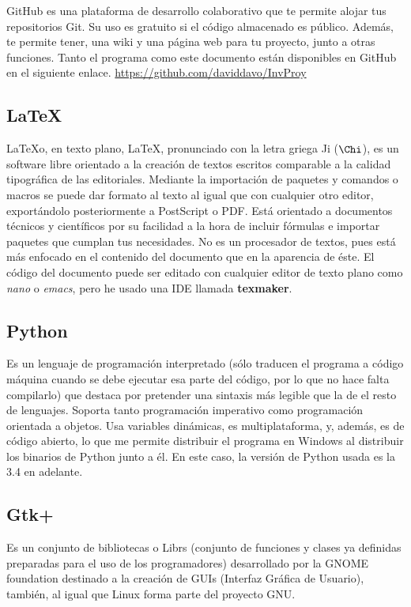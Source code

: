 \documentclass[a4paper, 11pt]{report} %
\begin{document}
GitHub es una plataforma de desarrollo colaborativo que te permite alojar tus repositorios Git. Su uso es gratuito si el código almacenado es público. Además, te permite tener, una wiki y una página web para tu proyecto, junto a otras funciones.
Tanto el programa como este documento están disponibles en GitHub en el siguiente enlace. \url{https://github.com/daviddavo/InvProy}

\subsection{LaTeX}
\LaTeX\space o, en texto plano, LaTeX, pronunciado con la letra griega 
Ji ($\Chi$), es un software libre orientado a la creación de textos escritos comparable a la calidad tipográfica de las editoriales. Mediante la importación de paquetes y comandos o macros se puede dar formato al texto al igual que con cualquier otro editor, exportándolo posteriormente a PostScript o PDF. Está orientado a documentos técnicos y científicos por su facilidad a la hora de incluir fórmulas e importar paquetes que cumplan tus necesidades. No es un procesador de textos, pues está más enfocado en el contenido del documento que en la aparencia de éste.
El código del documento puede ser editado con cualquier editor de texto plano como \textit{nano} o \textit{emacs}, pero he usado una IDE llamada \textbf{texmaker}.

\subsection{Python}
Es un lenguaje de programación interpretado (sólo traducen el programa a código máquina cuando se debe ejecutar esa parte del código, por lo que no hace falta compilarlo) que destaca por pretender una sintaxis más legible que la de el resto de lenguajes. Soporta tanto programación imperativo como programación orientada a objetos. Usa variables dinámicas, es multiplataforma, y, además, es de código abierto, lo que me permite distribuir el programa en Windows al distribuir los binarios de Python junto a él. En este caso, la versión de Python usada es la 3.4 en adelante.

\subsection{Gtk+}
Es un conjunto de bibliotecas o \glspl{Libr} (conjunto de funciones y clases ya definidas preparadas para el uso de los programadores) desarrollado por la GNOME foundation destinado a la creación de GUIs (Interfaz Gráfica de Usuario), también, al igual que Linux forma parte del proyecto GNU.
\end{document}
